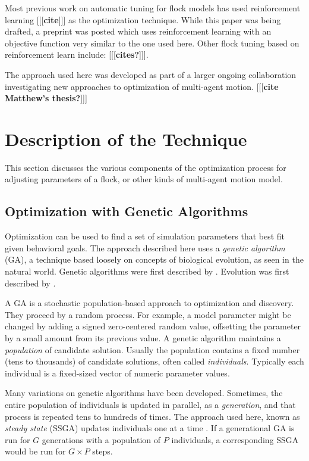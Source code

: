 \documentclass[letterpaper]{article}
\begin{document}
Most previous work on automatic tuning for flock models has used reinforcement learning [[[\textbf{cite}]]] as the optimization technique. While this paper was being drafted, a preprint was posted \citep{brambati_learning_2025} which uses reinforcement learning with an objective function very similar to the one used here. Other flock tuning based on reinforcement learn include:
[[[\textbf{cites?}]]].


The approach used here was developed as part of a larger ongoing collaboration investigating new approaches to optimization of multi-agent motion. [[[\textbf{cite Matthew's thesis?}]]]

\section{Description of the Technique}
\label{sec:Description}

This section discusses the various components of the optimization process for adjusting parameters of a flock, or other kinds of multi-agent motion model.

\subsection{Optimization with Genetic Algorithms}
\label{subsec:Optimization_with_GA}

Optimization can be used to find a set of simulation parameters that best fit given behavioral goals. The approach described here uses a \textit{genetic algorithm} (GA), a technique based loosely on concepts of biological evolution, as seen in the natural world. Genetic algorithms were first described by \citet{holland_adaptation_1975}. Evolution was first described by \citet{darwin_origin_1859}.

A GA is a stochastic population-based approach to optimization and discovery. They proceed by a random process. For example, a model parameter might be changed by adding a signed zero-centered random value, offsetting the parameter by a small amount from its previous value. A genetic algorithm maintains a \textit{population} of candidate solution. Usually the population contains a fixed number (tens to thousands) of candidate solutions, often called \textit{individuals}. Typically each individual is a fixed-sized vector of numeric parameter values.

Many variations on genetic algorithms have been developed. Sometimes, the entire population of individuals is updated in parallel, as a \textit{generation}, and that process is repeated tens to hundreds of times. The approach used here, known as \textit{steady state} (SSGA) updates individuals one at a time \citep{syswerda_study_1991}. If a generational GA is run for $G$ generations with a population of $P$ individuals, a corresponding SSGA would be run for $G{\times}P$ steps.
\end{document}

